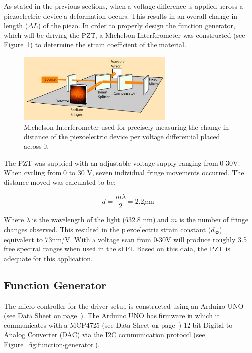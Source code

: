\documentclass[12pt,journal]{IEEEtran}
\begin{document}
As stated in the previous sections, when a voltage difference is applied across a piezoelectric device a deformation occurs. This results in an overall change in length ($\Delta L$) of the piezo. In order to properly design the function generator, which will be driving the PZT, a Michelson Interferometer was constructed (see Figure~\ref{fig:michelson-interferometer}) to determine the strain coefficient of the material. 

\begin{figure}
\centering
	\includegraphics[width=3in]{./michelson.png}
	\caption[Michelson Interferometer]{Michelson Interferometer used for precisely measuring the change in distance of the piezoelectric device per voltage differential placed across it~\cite{michaelson}}
	\label{fig:michelson-interferometer}
\end{figure}

The PZT was supplied with an adjustable voltage supply ranging from 0-30V. When cycling from 0 to 30 V, seven individual fringe movements occurred. The distance moved was calculated to be:

\begin{equation}
d = \frac{m\lambda}{2} = 2.2 \mu \text{m}
\end{equation}

Where $\lambda$ is the wavelength of the light (632.8 nm) and $m$ is the number of fringe changes observed. This resulted in the piezoelectric strain constant ($d_{33}$) equivalent to $73 \text{nm/V}$. With a voltage scan from 0-30V will produce roughly 3.5 free spectral ranges when used in the sFPI. Based on this data, the PZT is adequate for this application.


\subsection{Function Generator}

The micro-controller for the driver setup is constructed using an Arduino UNO (see Data Sheet on page~\pageref{datasheet:arduino_uno}). The Arduino UNO has firmware in which it communicates with a MCP4725 (see Data Sheet on page~\pageref{datasheet:mcp4725}) 12-bit Digital-to-Analog Converter (DAC) via the I2C communication protocol (see Figure~\ref{fig:function-generator}).
\end{document}
